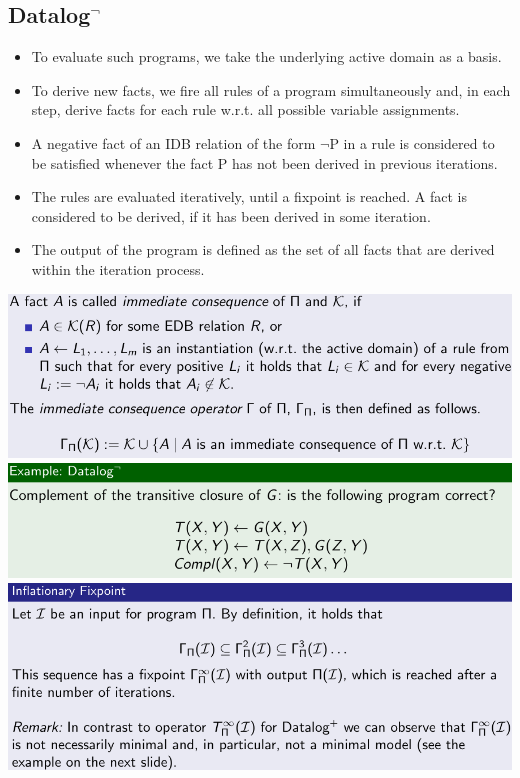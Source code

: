 \documentclass{article}
\begin{document}
\subsection{Datalog$^\neg$}
\begin{itemize}
\item To evaluate such programs, we take the underlying active domain as a basis.\\
\item To derive new facts, we fire all rules of a program simultaneously and, in each step, derive facts for each rule w.r.t. all possible variable assignments.\\
\item A negative fact of an IDB relation of the form $\neg$P in a rule is considered to be satisfied whenever the fact P has not been derived in previous iterations.\\
\item The rules are evaluated iteratively, until a fixpoint is reached. A fact is considered to be derived, if it has been derived in some iteration.\\
\item The output of the program is defined as the set of all facts that are derived within the iteration process.\\
\end{itemize}
\includegraphics[scale=0.3]{87.png}\\
\includegraphics[scale=0.3]{88.png}\\
\includegraphics[scale=0.3]{89.png}\\
\end{document}
